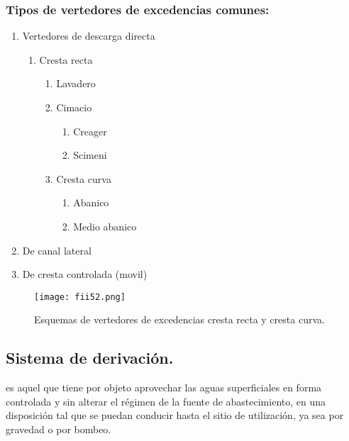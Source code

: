 \subsubsection{Tipos de vertedores de excedencias comunes:}

\begin{enumerate}[noitemsep]
	\item Vertedores de descarga directa
	      \begin{enumerate}
		      \item Cresta recta
		            \begin{enumerate}
			            \item Lavadero
			            \item Cimacio
			                  \begin{enumerate}
				                  \item Creager
				                  \item Scimeni
			                  \end{enumerate}
			            \item Cresta curva
			                  \begin{enumerate}
				                  \item Abanico
				                  \item Medio abanico
			                  \end{enumerate}
		            \end{enumerate}
	      \end{enumerate}
	\item De canal lateral
	\item De cresta controlada (movil)
\end{enumerate}

\begin{figure}[h!]
	\centerline{\texttt{[image: fii52.png]}}
	\caption{Esquemas de vertedores de excedencias cresta recta y cresta curva.}
	\label{fii52}
\end{figure}


\subsection{Sistema de derivación.}

\begin{definition}
	es aquel que tiene por objeto aprovechar las aguas
	superficiales en forma controlada y sin alterar el régimen de la fuente de
	abastecimiento, en una disposición tal que se puedan conducir hasta el sitio de
	utilización, ya sea por gravedad o por bombeo.
\end{definition}

